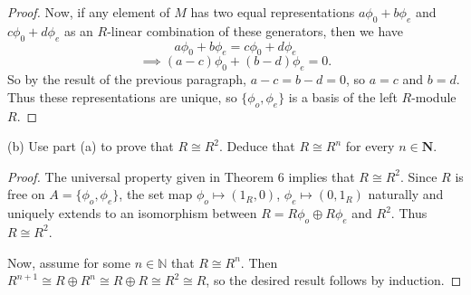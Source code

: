 \documentclass[10pt]{article}
\begin{document}
\begin{enumerate}
\begin{proof}
Now, if any element of $M$ has two equal representations $a\phi_0 + b\phi_e$ and $c\phi_0 + d\phi_e$ as an $R$-linear combination of these generators, then we have
$$
a\phi_0 + b\phi_e = c\phi_0 + d\phi_e
$$
$$
\implies
(a-c)\phi_0 + (b-d)\phi_e = 0.
$$
So by the result of the previous paragraph, $a-c = b-d = 0$, so $a = c$ and $b = d$.  Thus these representations are unique, so $\{ \phi_o, \phi_e\}$ is a basis of the left $R$-module $R$.
\end{proof}

(b) Use part (a) to prove that $R \cong R^2$.  Deduce that $R \cong R^n$ for every $n \in \mathbf{N}$.

\begin{proof}
The universal property given in Theorem 6 implies that $R \cong R^2$.  Since $R$ is free on $A = \{\phi_o, \phi_e\}$, the set map $\phi_o \mapsto (1_R,0)$, $\phi_e \mapsto (0,1_R)$ naturally and uniquely extends to an isomorphism between $R=R\phi_o \oplus R\phi_e$ and $R^2$.  Thus $R \cong R^2$.

Now, assume for some $n \in \mathbb{N}$ that $R \cong R^n$.  Then $R^{n+1} \cong R \oplus R^n \cong R \oplus R \cong R^2 \cong R$, so the desired result follows by induction.
\end{proof}

\end{enumerate}
\end{document}
